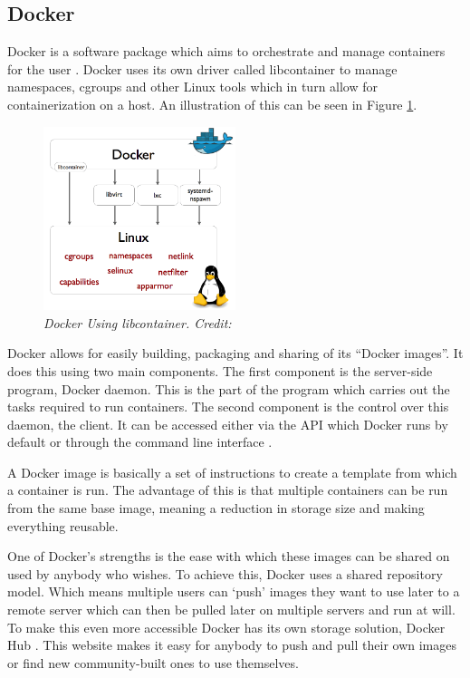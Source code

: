 \documentclass{article}
\begin{document}
\subsection{Docker}
\label{sub:Docker}
Docker is a software package which aims to orchestrate and manage containers for the user \citep{docker2016}. Docker uses its own driver called libcontainer to manage namespaces, cgroups and other Linux tools \citep{Hykes2014} which in turn allow for containerization on a host. An illustration of this can be seen in Figure \ref{fig:docker-driver}.

\begin{figure}[!h]
\centering
\includegraphics*[width=0.5\textwidth]{components/images/docker-driver}
\caption{\em Docker Using libcontainer. Credit: \citep{Hykes2014}}
\label{fig:docker-driver}
\end{figure}

Docker allows for easily building, packaging and sharing of its ``Docker images''. It does this using two main components. The first component is the server-side program, Docker daemon. This is the part of the program which carries out the tasks required to run containers. The second component is the control over this daemon, the client. It can be accessed either via the API which Docker runs by default or through the command line interface \citep{Engine2016}.

A Docker image is basically a set of instructions to create a template from which a container is run. The advantage of this is that multiple containers can be run from the same base image, meaning a reduction in storage size and making everything reusable. 

One of Docker's strengths is the ease with which these images can be shared on used by anybody who wishes. To achieve this, Docker uses a shared repository model. Which means multiple users can `push' images they want to use later to a remote server which can then be pulled later on multiple servers and run at will. To make this even more accessible Docker has its own storage solution, Docker Hub \citep{Hub2016}. This website makes it easy for anybody to push and pull their own images or find new community-built ones to use themselves.
\end{document}
